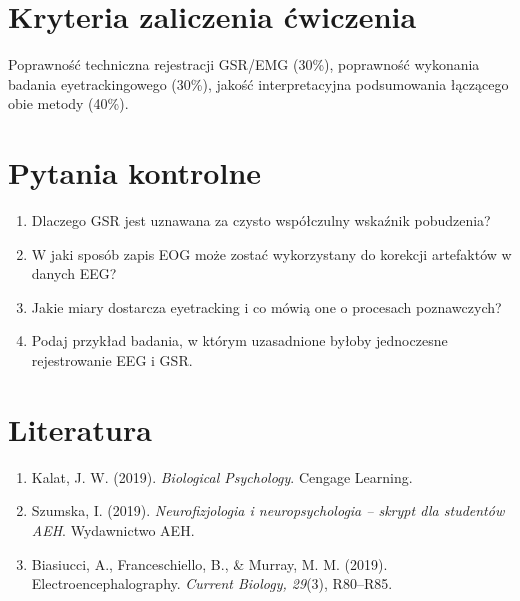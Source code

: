 \documentclass[11pt,a4paper]{article}
\begin{document}
\section{Kryteria zaliczenia ćwiczenia}
Poprawność techniczna rejestracji GSR/EMG (30\%), poprawność wykonania badania eyetrackingowego (30\%), jakość interpretacyjna podsumowania łączącego obie metody (40\%).

\section{Pytania kontrolne}
\begin{enumerate}[nosep]
  \item Dlaczego GSR jest uznawana za czysto \guillemotleft współczulny\guillemotright{} wskaźnik pobudzenia?
  \item W jaki sposób zapis EOG może zostać wykorzystany do korekcji artefaktów w danych EEG?
  \item Jakie miary dostarcza eyetracking i co mówią one o procesach poznawczych?
  \item Podaj przykład badania, w którym uzasadnione byłoby jednoczesne rejestrowanie EEG i GSR.
\end{enumerate}

\section{Literatura}
\begin{enumerate}[nosep]
  \item Kalat, J. W. (2019). \emph{Biological Psychology}. Cengage Learning.
  \item Szumska, I. (2019). \emph{Neurofizjologia i neuropsychologia -- skrypt dla studentów AEH}. Wydawnictwo AEH.
  \item Biasiucci, A., Franceschiello, B., \& Murray, M. M. (2019). Electroencephalography. \emph{Current Biology, 29}(3), R80--R85.
\end{enumerate}
\end{document}
